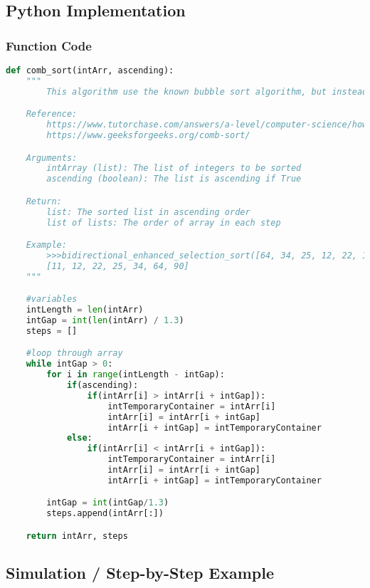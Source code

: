 \documentclass{article}
\begin{document}
\subsection*{Python Implementation}
\subsubsection*{Function Code}
\begin{lstlisting}[language=Python]
def comb_sort(intArr, ascending):
    """
        This algorithm use the known bubble sort algorithm, but instead of comparing the adjacent pairs it repeatedly sort pairs of element that are a certain gap apart. This gap starts as the length of the list and is continuously reduced by diving it to 1.3 at each cycle. 

    Reference:
        https://www.tutorchase.com/answers/a-level/computer-science/how-does-the-comb-sort-algorithm-work
        https://www.geeksforgeeks.org/comb-sort/

    Arguments:
        intArray (list): The list of integers to be sorted
        ascending (boolean): The list is ascending if True

    Return:
        list: The sorted list in ascending order
        list of lists: The order of array in each step

    Example:
        >>>bidirectional_enhanced_selection_sort([64, 34, 25, 12, 22, 11, 90])
        [11, 12, 22, 25, 34, 64, 90]
    """

    #variables
    intLength = len(intArr)
    intGap = int(len(intArr) / 1.3)
    steps = []

    #loop through array
    while intGap > 0:
        for i in range(intLength - intGap):
            if(ascending):
                if(intArr[i] > intArr[i + intGap]):
                    intTemporaryContainer = intArr[i]
                    intArr[i] = intArr[i + intGap]
                    intArr[i + intGap] = intTemporaryContainer
            else:
                if(intArr[i] < intArr[i + intGap]):
                    intTemporaryContainer = intArr[i]
                    intArr[i] = intArr[i + intGap]
                    intArr[i + intGap] = intTemporaryContainer

        intGap = int(intGap/1.3)
        steps.append(intArr[:])

    return intArr, steps
\end{lstlisting}

\subsection*{Simulation / Step-by-Step Example}
\end{document}
